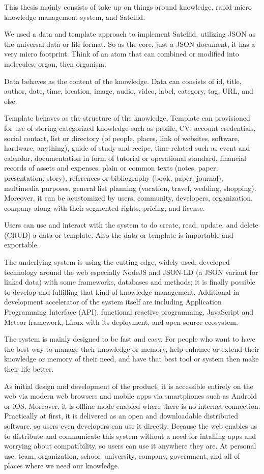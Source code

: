 This thesis mainly consists of take up on things around knowledge, rapid micro knowledge management system, and Satellid.

We used a data and template approach to implement Satellid, utilizing JSON as the universal data or file format.
So as the core, just a JSON document, it has a very micro footprint.
Think of an atom that can combined or modified into molecules, organ, then organism.

Data behaves as the content of the knowledge.
Data can consists of id, title, author, date, time, location, image, audio, video, label, category, tag, URL, and else.

Template behaves as the structure of the knowledge.
Template can provisioned for use of storing categorized knowledge such as profile, CV, account credentials, social contact, list or directory (of people, places, link of websites, software, hardware, anything), guide of study and recipe, time-related such as event and calendar, documentation in form of tutorial or operational standard, financial records of assets and expenses, plain or common texts (notes, paper, presentation, story), references or bibliography (book, paper, journal), multimedia purposes, general list planning (vacation, travel, wedding, shopping).
Moreover, it can be acustomized by users, community, developers, organization, company along with their segmented rights, pricing, and license.

Users can use and interact with the system to do create, read, update, and delete (CRUD) a data or template.
Also the data or template is importable and exportable.

The underlying system is using the cutting edge, widely used, developed technology around the web especially NodeJS and JSON-LD (a JSON variant for linked data) with some frameworks, databases and methods; it is finally possible to develop and fulfilling that kind of knowledge management.
Additional in development accelerator of the system itself are including Application Programming Interface (API), functional reactive programming, JavaScript and Meteor framework, Linux with its deployment, and open source ecosystem.

The system is mainly designed to be fast and easy.
For people who want to have the best way to manage their knowledge or memory,
help enhance or extend their knowledge or memory of their need, and
have that best tool or system then make their life better.

As initial design and development of the product, it is accessible entirely on the web via modern web browsers and mobile apps via smartphones such as Android or iOS.
Moreover, it is offline mode enabled where there is no internet connection.
Practically at first, it is delivered as an open and downloadable distributed software.
so users even developers can use it directly.
Because the web enables us to distribute and communicate this system without a need for intalling apps and worrying about compatibility,
so users can use it anywhere they are.
At personal use, team, organization, school, university, company, government, and all of places where we need our knowledge.

